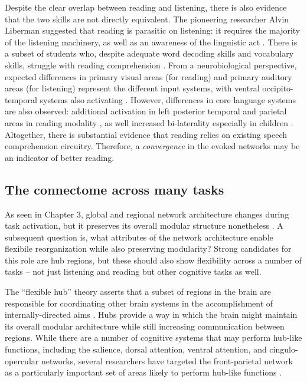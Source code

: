 Despite the clear overlap between reading and listening, there is also evidence that the two skills are not directly equivalent. The pioneering researcher Alvin Liberman suggested that reading is parasitic on listening: it requires the majority of the listening machinery, as well as an awareness of the linguistic act \citep{Mattingly1971}. There is a subset of students who, despite adequate word decoding skills and vocabulary skills, struggle with reading comprehension \citep{Pimperton2010, Spencer2014}. From a neurobiological perspective, expected differences in primary visual areas (for reading) and primary auditory areas (for listening) represent the different input systems, with ventral occipito-temporal systems also activating \citep{Jobard2007}. However, differences in core language systems are also observed: additional activation in left posterior temporal and parietal areas in reading modality \citep{Constable2004}, as well increased bi-laterality especially in children \citep{Berl2011}. Altogether, there is substantial evidence that reading relies on existing speech comprehension circuitry. Therefore, a \textit{convergence} in the evoked networks may be an indicator of better reading.

\subsection{The connectome across many tasks}

As seen in Chapter 3, global and regional network architecture changes during task activation, but it preserves its overall modular structure nonetheless \citep{Cole2014}. A subsequent question is, what attributes of the network architecture enable flexibile reorganization while also preserving modularity? Strong candidates for this role are hub regions, but these should also show flexibility across a number of tasks -- not just listening and reading but other cognitive tasks as well. 

The ``flexible hub'' theory asserts that a subset of regions in the brain are responsible for coordinating other brain systems in the accomplishment of internally-directed aims \citep{Cole2007}. Hubs provide a way in which the brain might maintain its overall modular architecture while still increasing communication between regions. While there are a number of cognitive systems that may perform hub-like functions, including the salience, dorsal attention, ventral attention, and cingulo-opercular networks, several researchers have targeted the front-parietal network as a particularly important set of areas likely to perform hub-like functions \citep{Cole2013, Niendam2012}. 

